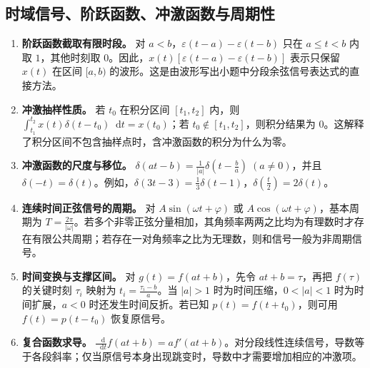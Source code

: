\documentclass[12pt,a4paper]{ctexart}
\newcommand{\eps}{\varepsilon}
\newcommand{\dif}{\mathop{}\!\mathrm{d}}
\begin{document}
\subsection{时域信号、阶跃函数、冲激函数与周期性}
\begin{enumerate}
\item \textbf{阶跃函数截取有限时段。} 对 $a<b$，\(\displaystyle \eps(t-a)-\eps(t-b)\) 只在 $a\le t<b$ 内取 $1$，其他时刻取 $0$。因此，\(\displaystyle x(t)[\eps(t-a)-\eps(t-b)]\) 表示只保留 $x(t)$ 在区间 $[a,b)$ 的波形。这是由波形写出小题中分段余弦信号表达式的直接方法。

\item \textbf{冲激抽样性质。} 若 $t_0$ 在积分区间 $[t_1,t_2]$ 内，则 \(\displaystyle \int_{t_1}^{t_2}x(t)\delta(t-t_0)\dif t=x(t_0)\)；若 $t_0\notin[t_1,t_2]$，则积分结果为 $0$。这解释了积分区间不包含抽样点时，含冲激函数的积分为什么为零。

\item \textbf{冲激函数的尺度与移位。} \(\displaystyle \delta(at-b)=\frac{1}{|a|}\delta\left(t-\frac{b}{a}\right)\;(a\ne0)\)，并且 \(\displaystyle \delta(-t)=\delta(t)\)。例如，\(\displaystyle \delta(3t-3)=\frac13\delta(t-1)\)，\(\displaystyle \delta\left(\frac t2\right)=2\delta(t)\)。

\item \textbf{连续时间正弦信号的周期。} 对 \(\displaystyle A\sin(\omega t+\varphi)\) 或 \(\displaystyle A\cos(\omega t+\varphi)\)，基本周期为 \(\displaystyle T=\frac{2\pi}{|\omega|}\)。若多个非零正弦分量相加，其角频率两两之比均为有理数时才存在有限公共周期；若存在一对角频率之比为无理数，则和信号一般为非周期信号。

\item \textbf{时间变换与支撑区间。} 对 \(\displaystyle g(t)=f(at+b)\)，先令 \(\displaystyle at+b=\tau\)，再把 $f(\tau)$ 的关键时刻 $\tau_i$ 映射为 \(\displaystyle t_i=\frac{\tau_i-b}{a}\)。当 $|a|>1$ 时为时间压缩，$0<|a|<1$ 时为时间扩展，$a<0$ 时还发生时间反折。若已知 $p(t)=f(t+t_0)$，则可用 \(\displaystyle f(t)=p(t-t_0)\) 恢复原信号。

\item \textbf{复合函数求导。} \(\displaystyle \frac{\dif}{\dif t}f(at+b)=a f'(at+b)\)。对分段线性连续信号，导数等于各段斜率；仅当原信号本身出现跳变时，导数中才需要增加相应的冲激项。
\end{enumerate}
\end{document}
